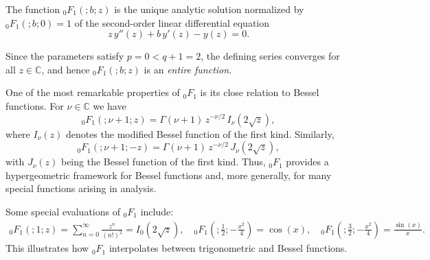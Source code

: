 \documentclass[a4paper,11pt,reqno]{amsart}
\begin{document}
The function ${}_0F_1(;b;z)$ is the unique analytic solution normalized by ${}_0F_1(;b;0)=1$ of the second-order linear differential equation
\begin{equation}
z\,y''(z) + b\,y'(z) - y(z) = 0.
\end{equation}

Since the parameters satisfy $p=0 < q+1=2$, the defining series converges for all $z \in \mathbb{C}$, and hence ${}_0F_1(;b;z)$ is an \textit{entire function}.

One of the most remarkable properties of ${}_0F_1$ is its close relation to Bessel functions. For $\nu \in \mathbb{C}$ we have
\begin{equation}
{}_0F_1(; \nu+1; z) = \Gamma(\nu+1)\, z^{-\nu/2}\, I_\nu(2\sqrt{z}),
\end{equation}
where $I_\nu(z)$ denotes the modified Bessel function of the first kind. Similarly,
\begin{equation}
{}_0F_1(; \nu+1; -z) = \Gamma(\nu+1)\, z^{-\nu/2}\, J_\nu(2\sqrt{z}),
\end{equation}
with $J_\nu(z)$ being the Bessel function of the first kind. 
Thus, ${}_0F_1$ provides a hypergeometric framework for Bessel functions and, more generally, for many special functions arising in analysis.

Some special evaluations of ${}_0F_1$ include:
\begin{align*}
{}_0F_1(;1;z) = \sum_{n=0}^\infty \frac{z^n}{(n!)^2} = I_0(2\sqrt{z}), \quad
{}_0F_1\!\left(; \tfrac{1}{2}; -\tfrac{x^2}{4}\right) = \cos(x), \quad
{}_0F_1\!\left(; \tfrac{3}{2}; -\tfrac{x^2}{4}\right) = \frac{\sin(x)}{x}.
\end{align*}
This illustrates how ${}_0F_1$ interpolates between trigonometric and Bessel functions.
\end{document}
